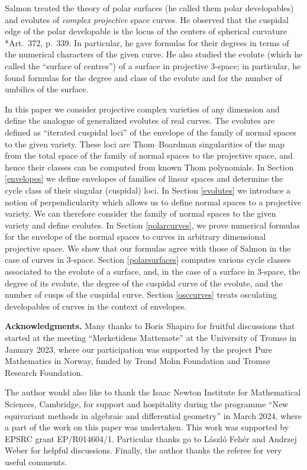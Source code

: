 \documentclass[reqno]{amsart}
\theoremstyle{definition}
\theoremstyle{remark}
\begin{document}
Salmon treated the theory of polar surfaces (he called them polar developables) and evolutes of \emph{complex projective} space curves. He observed that the cuspidal edge of the polar developable is the locus of the centers of spherical curvature  \cite{Salmon}*{Art.~372, p.~339}. In particular, he gave formulas for their degrees in terms of the numerical characters of the given  curve. He also studied the evolute (which he called the ``surface of centres'') of a surface in projective 3-space; in particular, he found formulas for the degree and class of the evolute and for the number of umbilics of the surface.

In this paper we consider projective complex varieties of any dimension and define the analogue of generalized evolutes of real curves. The evolutes are defined as ``iterated cuspidal loci'' of the envelope of the family of normal spaces to the given variety. These loci are Thom--Boardman singularities of the map from the total space of the family of normal spaces to the projective space, and hence their classes can be computed from known Thom polynomials.
In Section \ref{envelopes} we define envelopes of families of linear spaces and determine the cycle class of their singular (cuspidal) loci. In Section \ref{evolutes} we introduce a notion of perpendicularity which allows us to define normal spaces to a projective variety. We can therefore consider the family of normal spaces to the given variety and define evolutes. In Section \ref{polarcurves}, we prove numerical formulas for the envelope of the normal spaces to curves in arbitrary dimensional projective space. We show that our formulas agree with those of Salmon in the case of curves in 3-space. Section \ref{polarsurfaces} computes various cycle classes associated to the evolute of a surface, and, in the case of a surface in 3-space, the degree of its evolute, the degree of the cuspidal curve of the evolute, and the number of cusps of the cuspidal curve. Section \ref{osccurves} treats osculating developables of curves in the context of envelopes. 
\medskip

{\bf Acknowledgments.}
Many thanks to Boris Shapiro for fruitful discussions that started at the meeting ``Mørketidens Mattemøte'' at the University of Troms{\o} in January 2023, where our participation was supported by the project Pure Mathematics in Norway, funded by Trond Mohn Foundation and Troms{\o} Research Foundation.

The author would also like to thank the Isaac Newton Institute for Mathematical Sciences, Cambridge, for support and hospitality during the programme ``New equivariant methods in algebraic and differential geometry'' in March 2024, where a part of the work on this paper was undertaken. This work was supported by EPSRC grant EP/R014604/1. Particular thanks go to L\'aszl\'o Feh\'er and Andrzej Weber for helpful discussions. Finally, the author thanks the referee for very useful comments.
\end{document}
